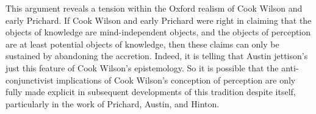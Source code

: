 \documentclass[12pt]{article}
\begin{document}
This argument reveals a tension within the Oxford realism of Cook Wilson and early Prichard. If Cook Wilson and early Prichard were right in claiming that the objects of knowledge are mind-independent objects, and the objects of perception are at least potential objects of knowledge, then these claims can only be sustained by abandoning the accretion. Indeed, it is telling that Austin jettison's just this feature of Cook Wilson's epistemology.  So it is possible that the anti-conjunctivist implications of Cook Wilson's conception of perception are only fully made explicit in subsequent developments of this tradition despite itself, particularly in the work of Prichard, Austin, and Hinton.


\nocite{Hobbes:1651fk}

 
 
\end{document}

